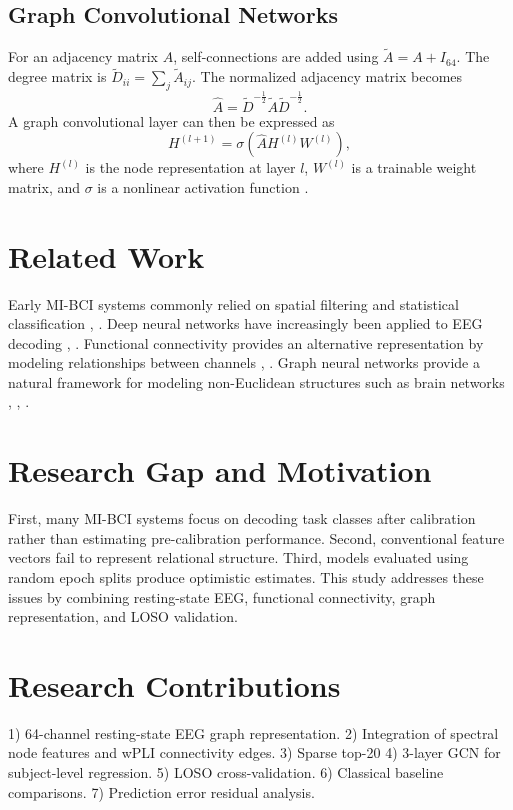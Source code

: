 \documentclass[conference]{IEEEtran}
\begin{document}
\subsection{Graph Convolutional Networks}
For an adjacency matrix $A$, self-connections are added using $\tilde{A} = A + I_{64}$. The degree matrix is $\tilde{D}_{ii} = \sum_j \tilde{A}_{ij}$. The normalized adjacency matrix becomes
\begin{equation}
\hat{A} = \tilde{D}^{-\frac{1}{2}} \tilde{A} \tilde{D}^{-\frac{1}{2}}.
\end{equation}
A graph convolutional layer can then be expressed as
\begin{equation}
H^{(l+1)} = \sigma\left( \hat{A} H^{(l)} W^{(l)} \right),
\end{equation}
where $H^{(l)}$ is the node representation at layer $l$, $W^{(l)}$ is a trainable weight matrix, and $\sigma$ is a nonlinear activation function \cite{kipf2017}.

\section{Related Work}
Early MI-BCI systems commonly relied on spatial filtering and statistical classification \cite{blankertz2008}, \cite{ramoser2000}. Deep neural networks have increasingly been applied to EEG decoding \cite{schirrmeister2017}, \cite{lawhern2018}. Functional connectivity provides an alternative representation by modeling relationships between channels \cite{vinck2011}, \cite{lachaux1999}. Graph neural networks provide a natural framework for modeling non-Euclidean structures such as brain networks \cite{kipf2017}, \cite{velickovic2018}, \cite{hamilton2017}.

\section{Research Gap and Motivation}
First, many MI-BCI systems focus on decoding task classes after calibration rather than estimating pre-calibration performance. Second, conventional feature vectors fail to represent relational structure. Third, models evaluated using random epoch splits produce optimistic estimates. This study addresses these issues by combining resting-state EEG, functional connectivity, graph representation, and LOSO validation.

\section{Research Contributions}
1) 64-channel resting-state EEG graph representation.
2) Integration of spectral node features and wPLI connectivity edges.
3) Sparse top-20%
4) 3-layer GCN for subject-level regression.
5) LOSO cross-validation.
6) Classical baseline comparisons.
7) Prediction error residual analysis.
\end{document}
